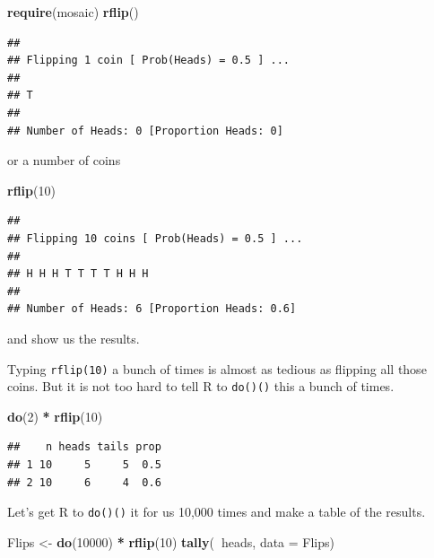 \documentclass[]{book}
\newenvironment{Shaded}{\begin{snugshade}}{\end{snugshade}}
\newcommand{\DataTypeTok}[1]{\textcolor[rgb]{0.13,0.29,0.53}{#1}}
\newcommand{\DecValTok}[1]{\textcolor[rgb]{0.00,0.00,0.81}{#1}}
\newcommand{\KeywordTok}[1]{\textcolor[rgb]{0.13,0.29,0.53}{\textbf{#1}}}
\newcommand{\NormalTok}[1]{#1}
\newcommand{\OperatorTok}[1]{\textcolor[rgb]{0.81,0.36,0.00}{\textbf{#1}}}
\newcommand{\StringTok}[1]{\textcolor[rgb]{0.31,0.60,0.02}{#1}}
\begin{document}
\begin{Shaded}
\begin{Highlighting}[]
\KeywordTok{require}\NormalTok{(mosaic)}
\KeywordTok{rflip}\NormalTok{()}
\end{Highlighting}
\end{Shaded}

\begin{verbatim}
## 
## Flipping 1 coin [ Prob(Heads) = 0.5 ] ...
## 
## T
## 
## Number of Heads: 0 [Proportion Heads: 0]
\end{verbatim}

or a number of coins

\begin{Shaded}
\begin{Highlighting}[]
\KeywordTok{rflip}\NormalTok{(}\DecValTok{10}\NormalTok{)}
\end{Highlighting}
\end{Shaded}

\begin{verbatim}
## 
## Flipping 10 coins [ Prob(Heads) = 0.5 ] ...
## 
## H H H T T T T H H H
## 
## Number of Heads: 6 [Proportion Heads: 0.6]
\end{verbatim}

and show us the results.

Typing \texttt{rflip(10)} a bunch of times is almost as tedious as flipping all those coins. But it is not too hard to tell R to \texttt{do()()} this a bunch of times.

\begin{Shaded}
\begin{Highlighting}[]
\KeywordTok{do}\NormalTok{(}\DecValTok{2}\NormalTok{) }\OperatorTok{*}\StringTok{ }\KeywordTok{rflip}\NormalTok{(}\DecValTok{10}\NormalTok{)}
\end{Highlighting}
\end{Shaded}

\begin{verbatim}
##    n heads tails prop
## 1 10     5     5  0.5
## 2 10     6     4  0.6
\end{verbatim}

Let's get R to \texttt{do()()} it for us 10,000 times and make a table of the results.

\begin{Shaded}
\begin{Highlighting}[]
\NormalTok{Flips <-}\StringTok{ }\KeywordTok{do}\NormalTok{(}\DecValTok{10000}\NormalTok{) }\OperatorTok{*}\StringTok{ }\KeywordTok{rflip}\NormalTok{(}\DecValTok{10}\NormalTok{)}
\KeywordTok{tally}\NormalTok{(}\OperatorTok{~}\NormalTok{heads, }\DataTypeTok{data =}\NormalTok{ Flips)}
\end{Highlighting}
\end{Shaded}
\end{document}
